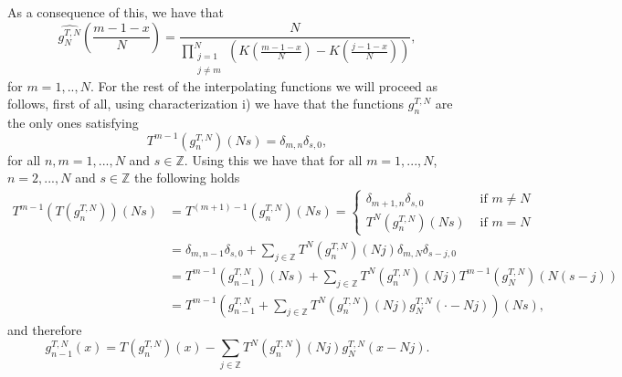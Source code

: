 \documentclass[reqno]{amsart}
\theoremstyle{plain}
\theoremstyle{definition}
\numberwithin{equation}{section}
\newcommand{\Z}{{\mathbb Z}}
\newcommand{\pa}[1]{\left(#1\right)}
\begin{document}
As a consequence of this, we have that
$$\widehat{g^{T,N}_N}\pa{\frac{m-1-x}{N}}
= \frac{N}{\prod_{\substack{j=1 \\ j\neq m}}^N \pa{K\pa{\frac{m-1-x}{N}}-K\pa{\frac{j-1-x}{N}}}},$$
for $m=1,..,N$. For the rest of the interpolating functions we will proceed as follows, first of all, using characterization i) we have that the functions $g^{T,N}_n$ are the only ones satisfying
$$T^{m-1}\pa{g^{T,N}_n}(N s)=\delta_{m,n}\delta_{s,0},$$
for all $n,m=1,...,N$ and $s\in\Z$. Using this we have that for all $m=1,...,N$, $n=2,...,N$ and $s\in\Z$ the following holds
\begin{align*}
    T^{m-1}\pa{T\pa{g^{T,N}_n}}(N s)
    &= T^{(m+1)-1}\pa{g^{T,N}_n}(N s)=
    \begin{cases}
        \delta_{m+1,n} \delta_{s,0} & \text{ if } m\neq N \\
        T^N\pa{g^{T,N}_n}(Ns) & \text{ if } m= N
    \end{cases} \\
    &= \delta_{m,n-1} \delta_{s,0} +\sum_{j\in\Z} T^N\pa{g^{T,N}_n}(Nj) \delta_{m,N} \delta_{s-j,0} \\
    &= T^{m-1}\pa{g^{T,N}_{n-1}}(Ns)+\sum_{j\in\Z} T^N\pa{g^{T,N}_n}(N j) T^{m-1}\pa{g^{T,N}_N}(N(s-j)) \\
    &= T^{m-1}\pa{g^{T,N}_{n-1}+\sum_{j\in\Z} T^N\pa{g^{T,N}_n}(N j) g^{T,N}_N(\cdot-Nj)}(Ns),
\end{align*}
and therefore 
$$g^{T,N}_{n-1}(x)=T\pa{g^{T,N}_n}(x)-\sum_{j\in\Z} T^N\pa{g^{T,N}_n}(N j) g^{T,N}_N(x-Nj).$$
\end{document}
